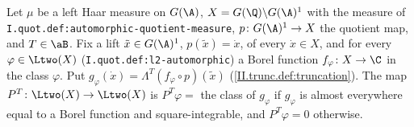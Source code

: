 Let $\mu$ be a left Haar measure on $G(\A)$, $X=G(\Q)\backslash G(\A)^1$ with the measure of \texttt{I.quot.def:automorphic-quotient-measure}, $p\colon G(\A)^1\to X$ the quotient
map, and $T\in\aB$. Fix a lift $\tilde x\in G(\A)^1$, $p(\tilde x)=\dot x$, of every $\dot x\in X$, and for every $\varphi\in\Ltwo(X)$ (\texttt{I.quot.def:l2-automorphic}) a Borel
function $f_\varphi\colon X\to\C$ in the class $\varphi$. Put $g_\varphi(\dot x)=\Lambda^T(f_\varphi\circ p)(\tilde x)$ (\cref{II.trunc.def:truncation}). The map
$P^T\colon\Ltwo(X)\to\Ltwo(X)$ is $P^T\varphi=$ the class of $g_\varphi$ if $g_\varphi$ is almost everywhere equal to a Borel function and square-integrable, and $P^T\varphi=0$
otherwise.
